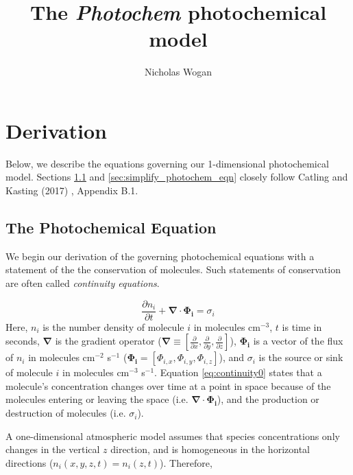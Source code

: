 \documentclass{article}
\begin{document}
\title{The \emph{Photochem} photochemical model}
\author{Nicholas Wogan}
\maketitle

\section{Derivation}
\label{sec:methods}

Below, we describe the equations governing our 1-dimensional photochemical model. Sections \ref{sec:photochem_eqn} and \ref{sec:simplify_photochem_eqn} closely follow Catling and Kasting (2017) \citep{Catling_2017}, Appendix B.1. 

\subsection{The Photochemical Equation} \label{sec:photochem_eqn}

We begin our derivation of the governing photochemical equations with a statement of the the conservation of molecules. Such statements of conservation are often called \emph{continuity equations}.

\begin{equation} \label{eq:continuity0}
  \frac{\partial n_{i}}{\partial t} + \bm{\nabla} \cdot \bm{\Phi_{i}} = \sigma_i
\end{equation}
Here, $n_i$ is the number density of molecule $i$ in molecules cm$^{-3}$, $t$ is time in seconds, $\bm{\nabla}$ is the gradient operator ($\bm{\nabla} \equiv [\frac{\partial}{\partial x}, \frac{\partial}{\partial y}, \frac{\partial}{\partial z}]$), $\bm{\Phi_{i}}$ is a vector of the flux of $n_i$ in molecules cm$^{-2}$ s$^{-1}$ ($\bm{\Phi_{i}} = [\Phi_{i,x},\Phi_{i,y},\Phi_{i,z}]$), and $\sigma_i$ is the source or sink of molecule $i$ in molecules cm$^{-3}$ s$^{-1}$. Equation \eqref{eq:continuity0} states that a molecule's concentration changes over time at a point in space because of the molecules entering or leaving the space (i.e. $\bm{\nabla} \cdot \bm{\Phi_{i}}$), and the production or destruction of molecules (i.e. $\sigma_i$). 

A one-dimensional atmospheric model assumes that species concentrations only changes in the vertical $z$ direction, and is homogeneous in the horizontal directions ($n_i(x,y,z,t) = n_i(z,t)$). Therefore,
\end{document}
